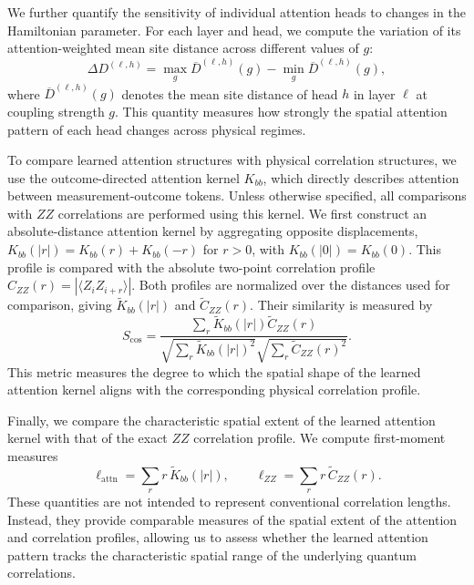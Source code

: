 \documentclass[pdflatex,sn-mathphys-num]{sn-jnl}%
\theoremstyle{thmstyleone}%
\theoremstyle{thmstyletwo}%
\theoremstyle{thmstylethree}%
\begin{document}
We further quantify the sensitivity of individual attention heads to changes in the Hamiltonian parameter. For each layer and head, we compute the variation of its attention-weighted mean site distance across different values of \(g\):
\begin{equation}
\Delta D^{(\ell,h)}
=
\max_g \overline{D}^{(\ell,h)}(g)
-
\min_g \overline{D}^{(\ell,h)}(g),
\end{equation}
where \(\overline{D}^{(\ell,h)}(g)\) denotes the mean site distance of head \(h\) in layer \(\ell\) at coupling strength \(g\). This quantity measures how strongly the spatial attention pattern of each head changes across physical regimes.

To compare learned attention structures with physical correlation structures, we use the outcome-directed attention kernel \(K_{bb}\), which directly describes attention between measurement-outcome tokens. Unless otherwise specified, all comparisons with \(ZZ\) correlations are performed using this kernel. We first construct an absolute-distance attention kernel by aggregating opposite displacements, \(K_{bb}(|r|)=K_{bb}(r)+K_{bb}(-r)\) for \(r>0\), with \(K_{bb}(|0|)=K_{bb}(0)\). This profile is compared with the absolute two-point correlation profile \(C_{ZZ}(r)=|\langle Z_iZ_{i+r}\rangle|\). Both profiles are normalized over the distances used for comparison, giving \(\widetilde{K}_{bb}(|r|)\) and \(\widetilde{C}_{ZZ}(r)\). Their similarity is measured by
\begin{equation}
S_{\mathrm{cos}}
=
\frac{
\sum_r
\widetilde{K}_{bb}(|r|)
\widetilde{C}_{ZZ}(r)
}{
\sqrt{
\sum_r
\widetilde{K}_{bb}(|r|)^2
}
\sqrt{
\sum_r
\widetilde{C}_{ZZ}(r)^2
}
}.
\end{equation}
This metric measures the degree to which the spatial shape of the learned attention kernel aligns with the corresponding physical correlation profile.

Finally, we compare the characteristic spatial extent of the learned attention kernel with that of the exact \(ZZ\) correlation profile. We compute first-moment measures
\begin{equation}
\ell_{\mathrm{attn}}
=
\sum_r r\,\widetilde{K}_{bb}(|r|),
\qquad
\ell_{ZZ}
=
\sum_r r\,\widetilde{C}_{ZZ}(r).
\end{equation}
These quantities are not intended to represent conventional correlation lengths. Instead, they provide comparable measures of the spatial extent of the attention and correlation profiles, allowing us to assess whether the learned attention pattern tracks the characteristic spatial range of the underlying quantum correlations.
\end{document}
